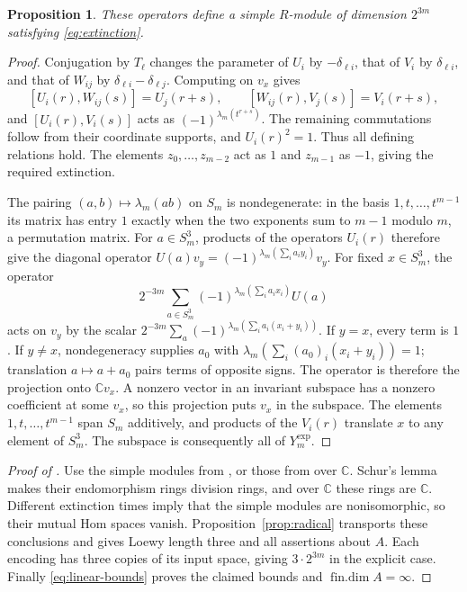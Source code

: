 \documentclass[11pt]{article}
\numberwithin{equation}{section}
\newtheorem{proposition}[theorem]{Proposition}
\theoremstyle{definition}
\theoremstyle{remark}
\newcommand{\C}{\mathbb C}
\DeclareMathOperator{\findim}{fin.dim}
\begin{document}
\begin{proposition}\label{prop:explicit}
These operators define a simple $R$-module of dimension $2^{3m}$
satisfying \eqref{eq:extinction}.
\end{proposition}
\begin{proof}
Conjugation by $T_\ell$ changes the parameter of $U_i$ by
$-\delta_{\ell i}$, that of $V_i$ by $\delta_{\ell i}$, and that
of $W_{ij}$ by $\delta_{\ell i}-\delta_{\ell j}$.
Computing on $v_x$ gives
\[
[U_i(r),W_{ij}(s)]=U_j(r+s),\qquad
[W_{ij}(r),V_j(s)]=V_i(r+s),
\]
and $[U_i(r),V_i(s)]$ acts as
$(-1)^{\lambda_m(t^{r+s})}$. The remaining commutations follow
from their coordinate supports, and $U_i(r)^2=1$.
Thus all defining relations hold. The elements $z_0,\ldots,z_{m-2}$
act as $1$ and $z_{m-1}$ as $-1$, giving the required extinction.

The pairing $(a,b)\mapsto\lambda_m(ab)$ on $S_m$ is nondegenerate:
in the basis $1,t,\ldots,t^{m-1}$ its matrix has entry $1$ exactly
when the two exponents sum to $m-1$ modulo $m$, a permutation matrix.
For $a\in S_m^3$, products of the operators $U_i(r)$ therefore give
the diagonal operator
$U(a)v_y=(-1)^{\lambda_m(\sum_i a_iy_i)}v_y$.
For fixed $x\in S_m^3$, the operator
\[
2^{-3m}\sum_{a\in S_m^3}
(-1)^{\lambda_m(\sum_i a_ix_i)}U(a)
\]
acts on $v_y$ by the scalar
$2^{-3m}\sum_a(-1)^{\lambda_m(\sum_i a_i(x_i+y_i))}$.
If $y=x$, every term is $1$. If $y\ne x$, nondegeneracy supplies
$a_0$ with $\lambda_m(\sum_i(a_0)_i(x_i+y_i))=1$; translation
$a\mapsto a+a_0$ pairs terms of opposite signs. The operator is
therefore the projection onto $\C v_x$.
A nonzero vector in an invariant subspace has a nonzero coefficient
at some $v_x$, so this projection puts $v_x$ in the subspace.
The elements $1,t,\ldots,t^{m-1}$ span $S_m$ additively, and products
of the $V_i(r)$ translate $x$ to any element of $S_m^3$. The subspace
is consequently all of $Y_m^{\mathrm{exp}}$.
\end{proof}

\begin{proof}[Proof of ]
Use the simple modules from , or those from
 over $\C$. Schur's lemma makes their endomorphism
rings division rings, and over $\C$ these rings are $\C$.
Different extinction times imply that the simple modules are
nonisomorphic, so their mutual Hom spaces vanish.
Proposition~\ref{prop:radical} transports these conclusions and gives
Loewy length three and all assertions about $A$. Each encoding has
three copies of its input space, giving $3\cdot2^{3m}$ in the explicit
case. Finally \eqref{eq:linear-bounds} proves the claimed bounds and
$\findim A=\infty$.
\end{proof}
\end{document}

